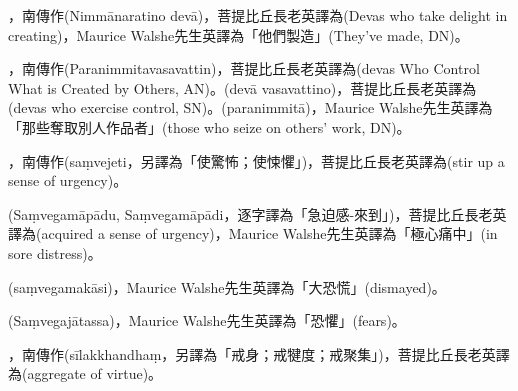 \startitemgroup[noteitems]
\item{}，南傳作(Nimmānaratino devā)，菩提比丘長老英譯為(Devas who take delight in creating)，Maurice Walshe先生英譯為「他們製造」(They've made, DN)。
\stopitemgroup

\startitemgroup[noteitems]
\item{}，南傳作(Paranimmitavasavattin)，菩提比丘長老英譯為(devas Who Control What is Created by Others, AN)。(devā vasavattino)，菩提比丘長老英譯為(devas who exercise control, SN)。(paranimmitā)，Maurice Walshe先生英譯為「那些奪取別人作品者」(those who seize on others' work, DN)。
\stopitemgroup

\startitemgroup[noteitems]
\item{}，南傳作(saṃvejeti，另譯為「使驚怖；使悚懼」)，菩提比丘長老英譯為(stir up a sense of urgency)。
\item{}(Saṃvegamāpādu, Saṃvegamāpādi，逐字譯為「急迫感-來到」)，菩提比丘長老英譯為(acquired a sense of urgency)，Maurice Walshe先生英譯為「極心痛中」(in sore distress)。
\item{}(saṃvegamakāsi)，Maurice Walshe先生英譯為「大恐慌」(dismayed)。
\item{}(Saṃvegajātassa)，Maurice Walshe先生英譯為「恐懼」(fears)。
\stopitemgroup

\startitemgroup[noteitems]
\item{}，南傳作(sīlakkhandhaṃ，另譯為「戒身；戒犍度；戒聚集」)，菩提比丘長老英譯為(aggregate of virtue)。
\stopitemgroup

